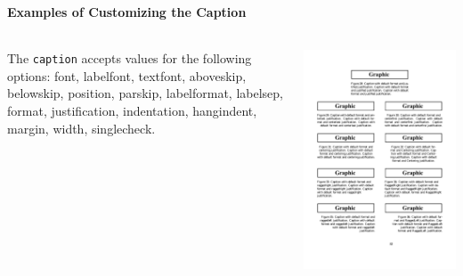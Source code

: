 \documentclass[article]{beamer}
\begin{document}
\begin{frame}
  \frametitle{\thesubsection}
  \framesubtitle{Examples of Customizing the Caption}
  \begin{columns}
    \begin{column}{0.5\textwidth}
      The \texttt{caption} accepts values for the following options: font,
      labelfont, textfont, aboveskip, belowskip, position, parskip,
      labelformat, labelsep, format, justification, indentation, hangindent,
      margin, width, singlecheck.
    \end{column}
    \begin{column}{0.5\textwidth}
      \colorbox{white}{\includegraphics[height=0.9\textheight]{captionsetup_example.pdf}}
    \end{column}
  \end{columns}
\end{frame}
\end{document}
